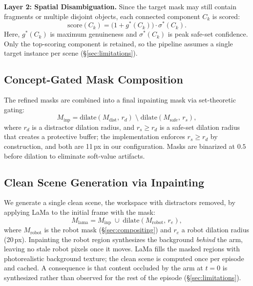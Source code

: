 \documentclass[letterpaper, 10 pt, conference]{ieeeconf}  %
\begin{document}
\textbf{Layer 2: Spatial Disambiguation.} Since the target mask may still contain fragments or multiple disjoint objects, each connected component $C_k$ is scored:
\begin{equation}
    \text{score}(C_k) = \bigl(1 + g^*(C_k)\bigr) \cdot \sigma^*(C_k).
    \label{eq:layer3}
\end{equation}
Here, $g^*(C_k)$ is maximum genuineness and $\sigma^*(C_k)$ is peak safe-set confidence. Only the top-scoring component is retained, so the pipeline assumes a single target instance per scene (\S\ref{sec:limitations}).



\subsection{Concept-Gated Mask Composition}
\label{sec:gating}
The refined masks are combined into a final inpainting mask via set-theoretic gating:
\begin{equation}
    M_{\text{inp}} = \text{dilate}(M_{\text{dist}},\, r_d) \;\setminus\; \text{dilate}(M_{\text{safe}},\, r_s),
    \label{eq:gating}
\end{equation}
where $r_d$ is a distractor dilation radius, and $r_s \geq r_d$ is a safe-set dilation radius that creates a protective buffer; the implementation enforces $r_s \geq r_d$ by construction, and both are 11\,px in our configuration. Masks are binarized at $0.5$ before dilation to eliminate soft-value artifacts.

\subsection{Clean Scene Generation via Inpainting}
\label{sec:inpainting}
We generate a single clean scene, the workspace with distractors removed, by applying LaMa \cite{lama} to the initial frame with the mask:
\begin{equation}
    M_{\text{lama}} = M_{\text{inp}} \;\cup\; \text{dilate}(M_{\text{robot}},\, r_e),
    \label{eq:inpaint_mask}
\end{equation}
where $M_{\text{robot}}$ is the robot mask (\S\ref{sec:compositing}) and $r_e$ a robot dilation radius (20\,px). Inpainting the robot region synthesizes the background \emph{behind} the arm, leaving no stale robot pixels once it moves. LaMa fills the masked regions with photorealistic background texture; the clean scene is computed once per episode and cached. A consequence is that content occluded by the arm at $t{=}0$ is synthesized rather than observed for the rest of the episode (\S\ref{sec:limitations}).
\end{document}
